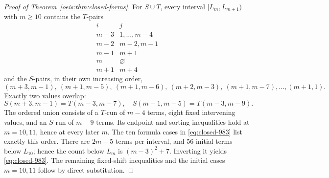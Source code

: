 \documentclass[11pt]{article}
\begin{document}
\begin{proof}[Proof of Theorem~\ref{oeis:thm:closed-forms}]
For \(S\cup T\), every interval \([L_m,L_{m+1})\)
with \(m\ge10\) contains the \(T\)-pairs
\[
\begin{array}{c|l}
i&j\\\hline
m-3&1,\ldots,m-4\\
m-2&m-2,m-1\\
m-1&m+1\\
m&\varnothing\\
m+1&m+4
\end{array}
\]
and the \(S\)-pairs, in their own increasing order,
\[
(m+3,m-1),\ (m+1,m-5),\ (m+1,m-6),\
(m+2,m-3),\ (m+1,m-7),\ldots,(m+1,1).
\]
Exactly two values overlap:
\[
S(m+3,m-1)=T(m-3,m-7),\quad
S(m+1,m-5)=T(m-3,m-9).
\]
The ordered union consists of a \(T\)-run of \(m-4\)
terms, eight fixed intervening values, and an
\(S\)-run of \(m-9\) terms. Its endpoint and
sorting inequalities hold at \(m=10,11\), hence
at every later \(m\). The ten formula cases in
\eqref{eq:closed-983} list exactly this order.
There are \(2m-5\) terms per interval, and
\(56\) initial terms below \(L_{10}\); hence the
count below \(L_m\) is \((m-3)^2+7\).
Inverting it yields \eqref{eq:closed-983}.
The remaining fixed-shift inequalities and the initial
cases $m=10,11$ follow by direct substitution.
\end{proof}
\end{document}
